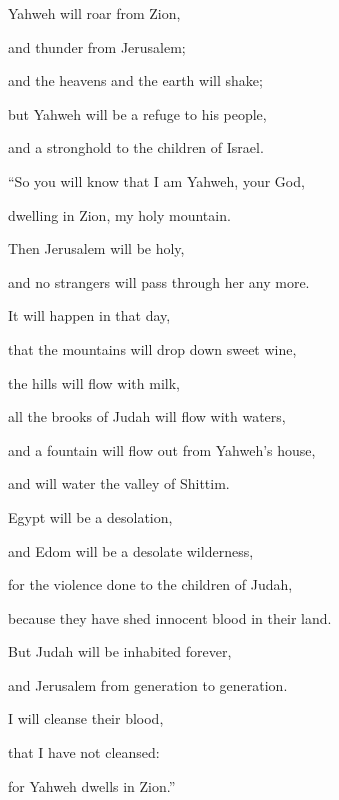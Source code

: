 {\par }{\Q {}Yahweh will roar from Zion,
\par }{\QB and thunder from Jerusalem;
\par }{\QB and the heavens and the earth will shake;
\par }{\QB but Yahweh will be a refuge to his people,
\par }{\QB and a stronghold to the children of Israel.
\par }{\Q {}“So you will know that I am Yahweh, your God,
\par }{\QB dwelling in Zion, my holy mountain.
\par }{\Q Then Jerusalem will be holy,
\par }{\QB and no strangers will pass through her any more.
\par }{\Q {}It will happen in that day,
\par }{\QB that the mountains will drop down sweet wine,
\par }{\QB the hills will flow with milk,
\par }{\QB all the brooks of Judah will flow with waters,
\par }{\QB and a fountain will flow out from Yahweh’s house,
\par }{\QB and will water the valley of Shittim.
\par }{\Q {}Egypt will be a desolation,
\par }{\QB and Edom will be a desolate wilderness,
\par }{\QB for the violence done to the children of Judah,
\par }{\QB because they have shed innocent blood in their land.
\par }{\Q {}But Judah will be inhabited forever,
\par }{\QB and Jerusalem from generation to generation.
\par }{\Q {}I will cleanse their blood,
\par }{\QB that I have not cleansed:
\par }{\QB for Yahweh dwells in Zion.”
\par }